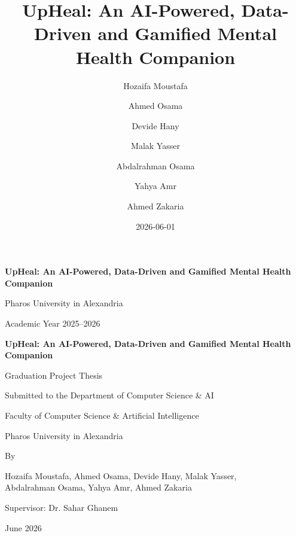 \documentclass[
  letterpaper,
  12pt,
  a4paper,
  openany]{report}
\title{UpHeal: An AI-Powered, Data-Driven and Gamified Mental Health
Companion}
\author{Hozaifa Moustafa \and Ahmed Osama \and Devide Hany \and Malak
Yasser \and Abdalrahman Osama \and Yahya Amr \and Ahmed Zakaria}
\date{2026-06-01}
\let\maketitle\relax
\begin{document}
\maketitle

\thispagestyle{empty}
\begin{titlepage}
  \centering
  \vspace*{2cm}
  {\fontsize{18}{22}\selectfont\textbf{UpHeal: An AI-Powered, Data-Driven and Gamified Mental Health Companion}\par}
  \vspace{2cm}
  \vspace{0.5cm}
  {\Large Pharos University in Alexandria}\par
  \vfill
  {\large Academic Year 2025--2026}\par
\end{titlepage}

\thispagestyle{empty}
\begin{titlepage}
  \centering
  \vspace*{2cm}
  {\fontsize{18}{22}\selectfont\textbf{UpHeal: An AI-Powered, Data-Driven and Gamified Mental Health Companion}\par}
  \vspace{1.5cm}
  {\large Graduation Project Thesis}\par
  \vspace{1cm}
  {\large Submitted to the Department of Computer Science \& AI}\par
  {\large Faculty of Computer Science \& Artificial Intelligence}\par
  {\large Pharos University in Alexandria}\par
  \vspace{1.5cm}
  {\large By}\par
  \vspace{0.5cm}
  {\normalsize
  Hozaifa Moustafa, Ahmed Osama, Devide Hany, Malak Yasser,\\
  Abdalrahman Osama, Yahya Amr, Ahmed Zakaria\par}
  \vspace{1cm}
  {\large Supervisor: Dr. Sahar Ghanem}\par
  \vfill
  {\large June 2026}\par
\end{titlepage}
\end{document}
